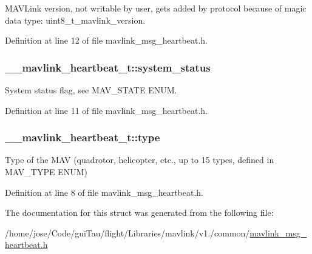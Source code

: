 M\-A\-V\-Link version, not writable by user, gets added by protocol because of magic data type\-: uint8\-\_\-t\-\_\-mavlink\-\_\-version. 



Definition at line 12 of file mavlink\-\_\-msg\-\_\-heartbeat.\-h.

\hypertarget{struct____mavlink__heartbeat__t_a914b772577c4898cc5bfe4ece1c8529d}{
\subsubsection[{system\-\_\-status}]{ \-\_\-\-\_\-mavlink\-\_\-heartbeat\-\_\-t\-::system\-\_\-status}}\label{struct____mavlink__heartbeat__t_a914b772577c4898cc5bfe4ece1c8529d}


System status flag, see M\-A\-V\-\_\-\-S\-T\-A\-T\-E E\-N\-U\-M. 



Definition at line 11 of file mavlink\-\_\-msg\-\_\-heartbeat.\-h.

\hypertarget{struct____mavlink__heartbeat__t_a2f34a5f641022acd59d9b54e69976341}{
\subsubsection[{type}]{ \-\_\-\-\_\-mavlink\-\_\-heartbeat\-\_\-t\-::type}}\label{struct____mavlink__heartbeat__t_a2f34a5f641022acd59d9b54e69976341}


Type of the M\-A\-V (quadrotor, helicopter, etc., up to 15 types, defined in M\-A\-V\-\_\-\-T\-Y\-P\-E E\-N\-U\-M) 



Definition at line 8 of file mavlink\-\_\-msg\-\_\-heartbeat.\-h.



The documentation for this struct was generated from the following file\-:\begin{DoxyCompactItemize}
\item 
/home/jose/\-Code/gui\-Tau/flight/\-Libraries/mavlink/v1./common/\hyperlink{mavlink__msg__heartbeat_8h}{mavlink\-\_\-msg\-\_\-heartbeat.\-h}\end{DoxyCompactItemize}
